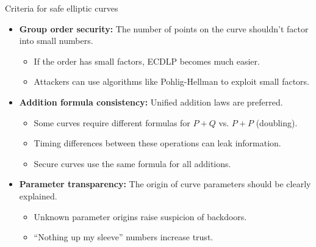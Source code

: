 \documentclass[aspectratio=169, lualatex, handout]{beamer}
\begin{document}
\begin{frame}{Criteria for safe elliptic curves}
	\begin{itemize}[<+->]
		\item \textbf{Group order security:} The number of points on the curve shouldn't factor into small numbers.
		      \begin{itemize}
			      \item If the order has small factors, ECDLP becomes much easier.
			      \item Attackers can use algorithms like Pohlig-Hellman to exploit small factors.
		      \end{itemize}
		\item \textbf{Addition formula consistency:} Unified addition laws are preferred.
		      \begin{itemize}
			      \item Some curves require different formulas for $P + Q$ vs. $P + P$ (doubling).
			      \item Timing differences between these operations can leak information.
			      \item Secure curves use the same formula for all additions.
		      \end{itemize}
		\item \textbf{Parameter transparency:} The origin of curve parameters should be clearly explained.
		      \begin{itemize}
			      \item Unknown parameter origins raise suspicion of backdoors.
			      \item ``Nothing up my sleeve'' numbers increase trust.
		      \end{itemize}
	\end{itemize}
\end{frame}
\end{document}
